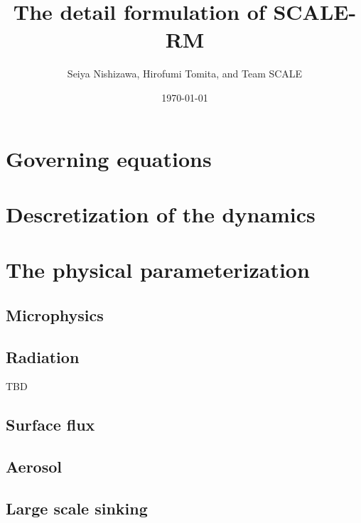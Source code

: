 \documentclass[a4paper]{report}
\title{{\LARGE The detail formulation of SCALE-RM}}
\author{Seiya Nishizawa, Hirofumi Tomita, and Team SCALE}
\date{\today}
\begin{document}
\maketitle
\tableofcontents




\chapter{Governing equations}


\chapter{Descretization of the dynamics}
\label{chap:descretization dynamics}














\chapter{The physical parameterization}



\section{Microphysics}


\section{Radiation}
{\Huge TBD}

\section{Surface flux}


\section{Aerosol}


\section{Large scale sinking}





\appendix






\end{document}
